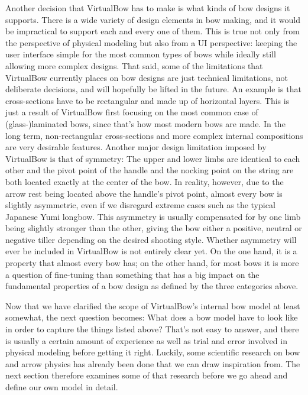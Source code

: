 Another decision that VirtualBow has to make is what kinds of bow designs it supports.
There is a wide variety of design elements in bow making, and it would be impractical to support each and every one of them.
This is true not only from the perspective of physical modeling but also from a UI perspective: keeping the user interface simple for the most common types of bows while ideally still allowing more complex designs.
That said, some of the limitations that VirtualBow currently places on bow designs are just technical limitations, not deliberate decisions, and will hopefully be lifted in the future.
An example is that cross-sections have to be rectangular and made up of horizontal layers.
This is just a result of VirtualBow first focusing on the most common case of \mbox{(glass-)laminated} bows, since that's how most modern bows are made.
In the long term, non-rectangular cross-sections and more complex internal compositions are very desirable features.
Another major design limitation imposed by VirtualBow is that of symmetry: The upper and lower limbs are identical to each other and the pivot point of the handle and the nocking point on the string are both located exactly at the center of the bow.
In reality, however, due to the arrow rest being located above the handle's pivot point, almost every bow is slightly asymmetric, even if we disregard extreme cases such as the typical Japanese Yumi longbow.
This asymmetry is usually compensated for by one limb being slightly stronger than the other, giving the bow either a positive, neutral or negative tiller depending on the desired shooting style.
Whether asymmetry will ever be included in VirtualBow is not entirely clear yet.
On the one hand, it is a property that almost every bow has; on the other hand, for most bows it is more a question of fine-tuning than something that has a big impact on the fundamental properties of a bow design as defined by the three categories above.


Now that we have clarified the scope of VirtualBow's internal bow model at least somewhat, the next question becomes: What does a bow model have to look like in order to capture the things listed above?
That's not easy to answer, and there is usually a certain amount of experience as well as trial and error involved in physical modeling before getting it right.
Luckily, some scientific research on bow and arrow physics has already been done that we can draw inspiration from.
The next section therefore examines some of that research before we go ahead and define our own model in detail.

